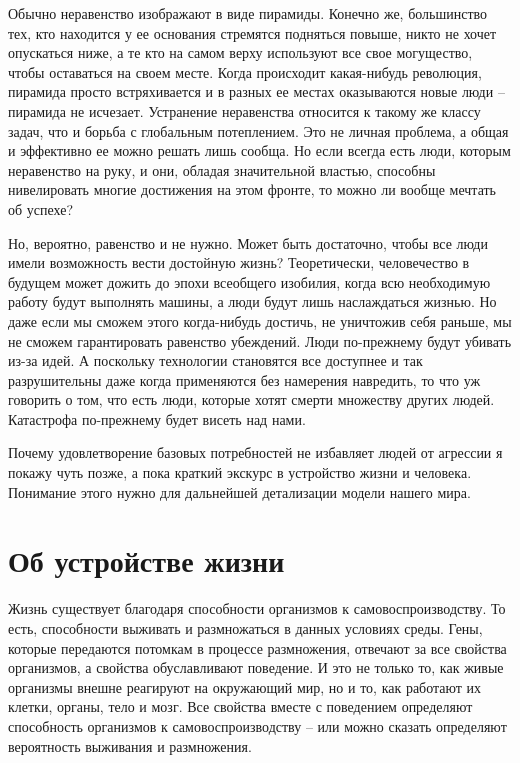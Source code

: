 \documentclass[12pt,a4paper]{report}
\begin{document}
\noindent Обычно неравенство изображают в виде пирамиды. Конечно же, большинство тех, кто находится у ее основания стремятся подняться повыше, никто не хочет опускаться ниже, а те кто на самом верху используют все свое могущество, чтобы оставаться на своем месте. Когда происходит какая-нибудь революция, пирамида просто встряхивается и в разных ее местах оказываются новые люди -- пирамида не исчезает. Устранение неравенства относится к такому же классу задач, что и борьба с глобальным потеплением. Это не личная проблема, а общая и эффективно ее можно решать лишь сообща. Но если всегда есть люди, которым неравенство на руку, и они, обладая значительной властью, способны нивелировать многие достижения на этом фронте, то можно ли вообще мечтать об успехе?

\noindent Но, вероятно, равенство и не нужно. Может быть достаточно, чтобы все люди имели возможность вести достойную жизнь? Теоретически, человечество в будущем может дожить до эпохи всеобщего изобилия, когда всю необходимую работу будут выполнять машины, а люди будут лишь наслаждаться жизнью. Но даже если мы сможем этого когда-нибудь достичь, не уничтожив себя раньше, мы не сможем гарантировать равенство убеждений. Люди по-прежнему будут убивать из-за идей. А поскольку технологии становятся все доступнее и так разрушительны даже когда применяются без намерения навредить, то что уж говорить о том, что есть люди, которые хотят смерти множеству других людей. Катастрофа по-прежнему будет висеть над нами.

\noindent Почему удовлетворение базовых потребностей не избавляет людей от агрессии я покажу чуть позже, а пока краткий экскурс в устройство жизни и человека. Понимание этого нужно для дальнейшей детализации модели нашего мира.

\section*{Об устройстве жизни}

Жизнь существует благодаря способности организмов к самовоспроизводству. То есть, способности выживать и размножаться в данных условиях среды. Гены, которые передаются потомкам в процессе размножения, отвечают за все свойства организмов, а свойства обуславливают поведение. И это не только то, как живые организмы внешне реагируют на окружающий мир, но и то, как работают их клетки, органы, тело и мозг. Все свойства вместе с поведением определяют способность организмов к самовоспроизводству -- или можно сказать определяют вероятность выживания и размножения.
\end{document}
